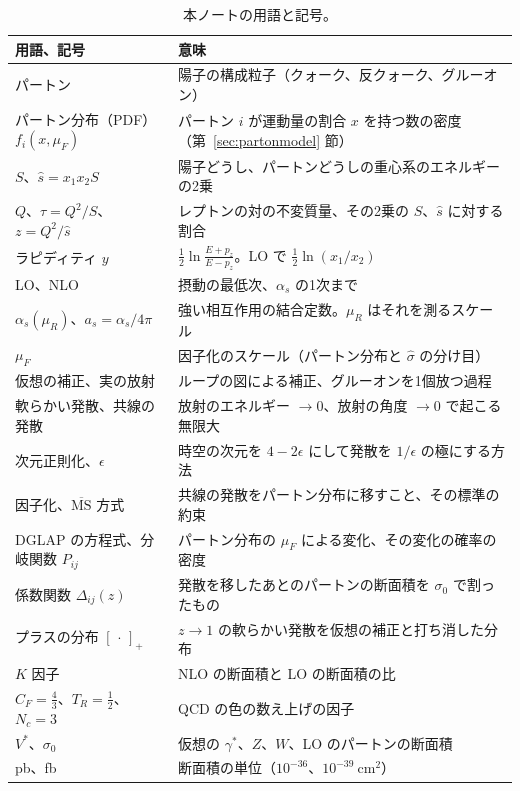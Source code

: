 \documentclass[a4paper,10pt]{ltjsarticle}
\newcommand{\MSbar}{\overline{\mathrm{MS}}}
\begin{document}
\begin{table}[htbp]
\centering\small
\caption{本ノートの用語と記号。}
\label{tab:glossary}
\begin{tabularx}{\linewidth}{>{\raggedright\arraybackslash}p{3.6cm}X}
\toprule
\textbf{用語、記号} & \textbf{意味} \\
\midrule
パートン & 陽子の構成粒子（クォーク、反クォーク、グルーオン） \\
パートン分布（PDF）$f_i(x,\mu_F)$ & パートン $i$ が運動量の割合 $x$ を持つ数の密度（第~\ref{sec:partonmodel} 節） \\
$S$、$\hat s=x_1x_2S$ & 陽子どうし、パートンどうしの重心系のエネルギーの2乗 \\
$Q$、$\tau=Q^2/S$、$z=Q^2/\hat s$ & レプトンの対の不変質量、その2乗の $S$、$\hat s$ に対する割合 \\
ラピディティ $y$ & $\frac12\ln\frac{E+p_z}{E-p_z}$。LO で $\frac12\ln(x_1/x_2)$ \\
LO、NLO & 摂動の最低次、$\alpha_s$ の1次まで \\
$\alpha_s(\mu_R)$、$a_s=\alpha_s/4\pi$ & 強い相互作用の結合定数。$\mu_R$ はそれを測るスケール \\
$\mu_F$ & 因子化のスケール（パートン分布と $\hat\sigma$ の分け目） \\
仮想の補正、実の放射 & ループの図による補正、グルーオンを1個放つ過程 \\
軟らかい発散、共線の発散 & 放射のエネルギー $\to0$、放射の角度 $\to0$ で起こる無限大 \\
次元正則化、$\epsilon$ & 時空の次元を $4-2\epsilon$ にして発散を $1/\epsilon$ の極にする方法 \\
因子化、$\MSbar$ 方式 & 共線の発散をパートン分布に移すこと、その標準の約束 \\
DGLAP の方程式、分岐関数 $P_{ij}$ & パートン分布の $\mu_F$ による変化、その変化の確率の密度 \\
係数関数 $\Delta_{ij}(z)$ & 発散を移したあとのパートンの断面積を $\sigma_0$ で割ったもの \\
プラスの分布 $[\,\cdot\,]_+$ & $z\to1$ の軟らかい発散を仮想の補正と打ち消した分布 \\
$K$ 因子 & NLO の断面積と LO の断面積の比 \\
$C_F=\frac43$、$T_R=\frac12$、$N_c=3$ & QCD の色の数え上げの因子 \\
$V^*$、$\sigma_0$ & 仮想の $\gamma^*$、$Z$、$W$、LO のパートンの断面積 \\
pb、fb & 断面積の単位（$10^{-36}$、$10^{-39}~\mathrm{cm}^2$） \\

\end{tabularx}
\end{table}
\end{document}
